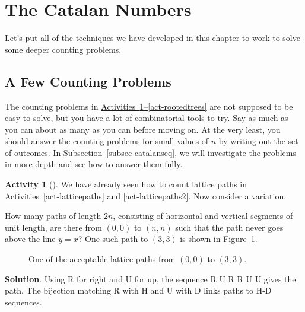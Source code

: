 \documentclass[10pt,]{book}
\theoremstyle{plain}
\theoremstyle{definition}
\theoremstyle{definition}
\theoremstyle{definition}
\newtheorem{activity}[project]{Activity}
\numberwithin{equation}{chapter}
\begin{document}
\section[{The Catalan Numbers}]{The Catalan Numbers}\label{sec_basic-catalan}
\hypertarget{p-989}{}%
Let's put all of the techniques we have developed in this chapter to work to solve some deeper counting problems.%
\typeout{************************************************}
\typeout{************************************************}
\subsection[{A Few Counting Problems}]{A Few Counting Problems}\label{subsec-catalanprobs}
\hypertarget{p-990}{}%
The counting problems in \hyperref[act-lowerpaths]{Activities~\ref{act-lowerpaths}--\ref{act-rootedtrees}} are not supposed to be easy to solve, but you have a lot of combinatorial tools to try.  Say as much as you can about as many as you can before moving on.  At the very least, you should answer the counting problems for small values of \(n\) by writing out the set of outcomes.  In \hyperref[subsec-catalanseq]{Subsection~\ref{subsec-catalanseq}}, we will investigate the problems in more depth and see how to answer them fully.%
\begin{activity}[]\label{act-lowerpaths}
\hypertarget{p-991}{}%
We have already seen how to count lattice paths in \hyperref[act-latticepaths]{Activities~\ref{act-latticepaths}} and \hyperref[act-latticepaths2]{\ref{act-latticepaths2}}.  Now consider a variation.%
\par
\hypertarget{p-992}{}%
How many paths of length \(2n\), consisting of horizontal and vertical segments of unit length, are there from \((0, 0)\) to \((n, n)\) such that the path never goes above the line \(y = x\)? One such path to \((3, 3)\) is shown in \hyperref[catalanpathex]{Figure~\ref{catalanpathex}}.%
\begin{figure}
\centering
{
}
\caption{One of the acceptable lattice paths from \((0,0)\) to \((3,3)\).\label{catalanpathex}}
\end{figure}
\par\smallskip%
\noindent\textbf{Solution}.\hypertarget{solution-75}{}\quad%
\hypertarget{p-993}{}%
Using R for right and U for up, the sequence R U R R U U gives the path. The bijection matching R with H and U with D links paths to H-D sequences.%
\end{activity}
\end{document}
